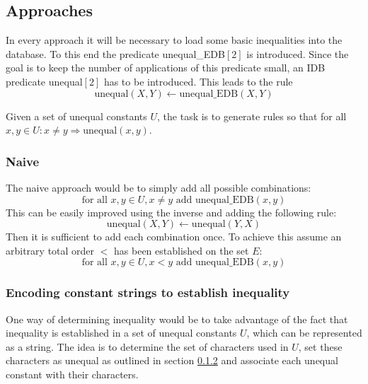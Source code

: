 \documentclass[hyperref,bachelorofscience,fleqn]{cgvpub}
\begin{document}
\subsection{Approaches}
In every approach it will be necessary to load some basic inequalities into the database. To this end the predicate unequal\_EDB\([2]\) is introduced. Since the goal is to keep the number of applications of this predicate small, an IDB predicate unequal\([2]\) has to be introduced. This leads to the rule
\begin{equation*}
\text{unequal}(X, Y) \leftarrow \text{unequal\_EDB}(X, Y)
\end{equation*}

Given a set of unequal constants \(U\), the task is to generate rules so that for all \( x, y \in U: x \ne y \Rightarrow \text{unequal}(x, y)\).

\subsubsection{Naive}\label{subsubsec_naive}
The naive approach would be to simply add all possible combinations:
\begin{equation*}
\text{for all } x, y \in U, x \ne y \text{ add } \text{unequal\_EDB}(x, y)
\end{equation*}
This can be easily improved using the inverse and adding the following rule:
\begin{equation}\label{equ_inverse}
\text{unequal}(X, Y) \leftarrow \text{unequal}(Y, X)
\end{equation}
Then it is sufficient to add each combination once. To achieve this assume an arbitrary total order \(<\) has been established on the set \(E\):
\begin{equation*}
\text{for all } x, y \in U, x < y \text{ add } \text{unequal\_EDB}(x, y)
\end{equation*}

\subsubsection{Encoding constant strings to establish inequality}\label{subsubsec_encoding}
One way of determining inequality would be to take advantage of the fact that inequality is established in a set of unequal constants \(U\), which can be represented as a string. The idea is to determine the set of characters used in \(U\), set these characters as unequal as outlined in section \ref{subsubsec_encoding} and associate each unequal constant with their characters.\\
\end{document}
